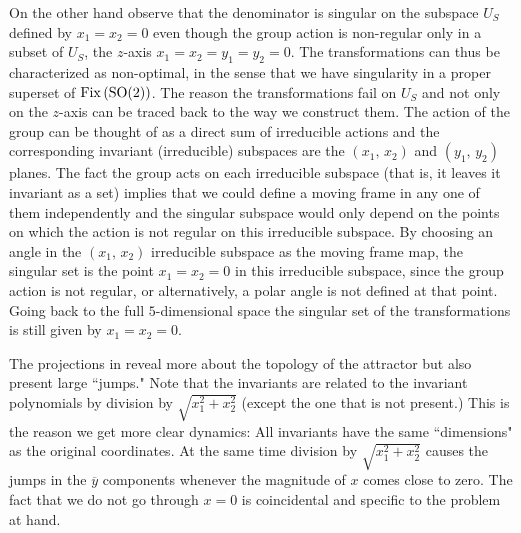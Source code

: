 On the other hand observe that the denominator is singular on
the subspace $U_S$ defined by $x_1=x_2=0$ even though the
group action is non-regular only in a subset of $U_S$, the
$z$-axis $x_1=x_2=y_1=y_2=0$. The transformations
 can thus be characterized as
non-optimal, in the sense that we have singularity in a
proper superset of $\mathrm{Fix}\left(\mathrm{SO}(2)\right)$. The reason the
transformations fail on $U_S$ and not only on the $z$-axis
can be traced back to the way we construct them. The action
of the group can be thought of as a direct sum of irreducible
actions and the corresponding invariant (irreducible)
subspaces are the $(x_1,\,x_2)$ and $(y_1,\,y_2)$
planes.
The
fact the group acts on each irreducible subspace (that is, it
leaves it invariant as a set) implies that we could define a
moving frame in any one of them independently and the
singular subspace would only depend on the points on which
the action is not regular on this irreducible subspace. By
choosing an angle in the $(x_1,\,x_2)$ irreducible subspace
as the moving frame map, the singular set is the point
$x_1=x_2=0$ in this irreducible subspace, since the group
action is not regular, or alternatively, a polar
angle is not defined at that point. Going back to the full
$5$-dimensional space the singular set of the transformations
is still given by $x_1=x_2=0$.

The projections in  reveal more about the
topology of the attractor but also present large ``jumps." Note that
the invariants  are related to the invariant polynomials 
by division by $\sqrt{x_1^2+x_2^2}$ (except the one that is not present.) This is the
reason we get more clear dynamics: All invariants have the same
``dimensions" as the original coordinates. At the same time division by $\sqrt{x_1^2+x_2^2}$
causes the jumps in the $\overline{y}$ components whenever the magnitude of $x$ comes close to zero.
The fact that we do not go through $x=0$ is coincidental and specific to the problem
at hand.

